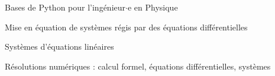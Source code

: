 
\item[\textsc{\scriptsize [Num]}] Bases de Python pour l'ingénieur$\cdot$e en Physique
\item[\textsc{\scriptsize [Phys]}] Mise en équation de systèmes régis par des équations différentielles
\item[\textsc{\scriptsize [Math]}] Systèmes d'équations linéaires
\item[\textsc{\scriptsize [Num]}] Résolutions numériques : calcul formel, équations différentielles, systèmes